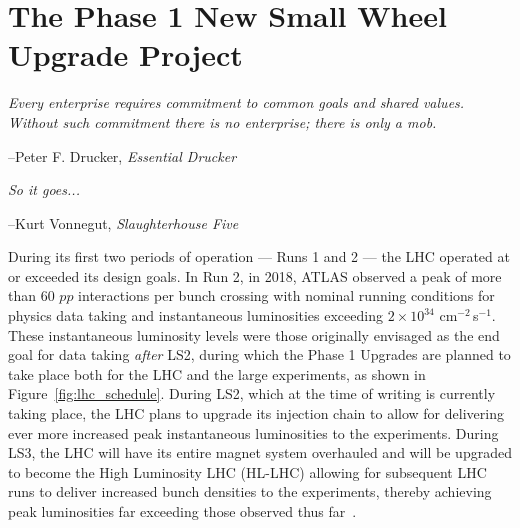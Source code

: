 \chapter{The Phase 1 New Small Wheel Upgrade Project}
\label{chap:nsw}



\epigraph{\textit{Every enterprise requires commitment to common goals and shared values. Without such commitment there is no enterprise; there is only a mob.}}{--Peter F. Drucker, \textit{Essential Drucker}}
\epigraph{\textit{So it goes...}}{--Kurt Vonnegut, \textit{Slaughterhouse Five}}

During its first two periods of operation --- Runs 1 and 2 --- the LHC operated
at or exceeded its design goals.
In Run 2, in 2018, ATLAS observed a peak of more than 60 $pp$ interactions per bunch crossing with nominal running conditions for physics data taking
and instantaneous luminosities exceeding $2\times 10^{34}$ cm$^{-2}$\,s$^{-1}$.
These instantaneous luminosity levels were those originally envisaged as the end goal for data taking \textit{after} LS2,
during which the Phase 1 Upgrades are planned to take place both for the LHC and the large experiments, as shown in Figure~\ref{fig:lhc_schedule}.
During LS2, which at the time of writing is currently taking place, the LHC plans to upgrade its injection chain to allow for delivering ever
more increased peak instantaneous luminosities to the experiments.
During LS3, the LHC will have its entire magnet system overhauled and will be upgraded to become the
High Luminosity LHC (HL-LHC) allowing for subsequent LHC runs to deliver increased bunch densities 
to the experiments, thereby achieving peak luminosities far exceeding those observed thus far~\cite{HLLHCPDR}.

